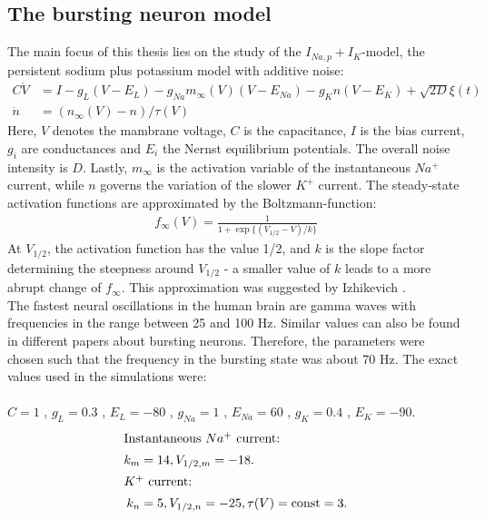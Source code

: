 \documentclass[12pt,a4paper]{article}
\begin{document}
\subsection{The bursting neuron model}
The main focus of this thesis lies on the study of the $I_{Na,p}+I_K$-model, the persistent sodium plus potassium model with additive noise:
\begin{align}\label{Veq}
C\dot{V} &= I - g_L(V-E_L) - g_{Na}m_{\infty}(V)(V-E_{Na}) - g_Kn(V-E_K)+\sqrt{2D}\xi(t)\\\label{neq}
\dot{n} &= (n_{\infty}(V)-n)/\tau(V)
\end{align}
Here, $V$ denotes the mambrane voltage, $C$ is the capacitance, $I$ is the bias current, $g_i$ are conductances and $E_i$ the Nernst equilibrium potentials. The overall noise intensity is $D$. Lastly, $m_{\infty}$ is the activation variable of the instantaneous $Na^+$ current, while $n$ governs the variation of the slower $K^+$ current. The steady-state activation functions are approximated by the Boltzmann-function:
\begin{align*}
f_{\infty}(V) = \frac{1}{1+\exp\{(V_{1/2}-V)/k\}}
\end{align*}
At $V_{1/2}$, the activation function has the value 1/2, and $k$ is the slope factor determining the steepness around $V_{1/2}$ - a smaller value of $k$ leads to a more abrupt change of $f_{\infty}$. This approximation was suggested by Izhikevich \cite{izi}.\\
The fastest neural oscillations in the human brain are gamma waves with frequencies in the range between 25 and 100 Hz\cite{gamma}\cite{gamma2}. Similar values can also be found in different papers about bursting neurons\cite{burstneu}\cite{burstneu2}. Therefore, the parameters were chosen such that the frequency in the bursting state was about 70 Hz.
The exact values used in the simulations were:\\\\
$C=1$ , $g_L=0.3$ , $E_L=-80$ , $g_{Na}=1$ , $E_{Na}=60$ , $g_K=0.4$ , $E_K=-90$.
\begin{align*}
\intertext{Instantaneous $Na^+$ current:} k_m&=14 , V_{1/2,m}=-18. 
\\
\intertext{$K^+$ current:} k_n&=5 , V_{1/2,n}=-25 , \tau(V)=\text{const}=3.
\end{align*}
\end{document}
